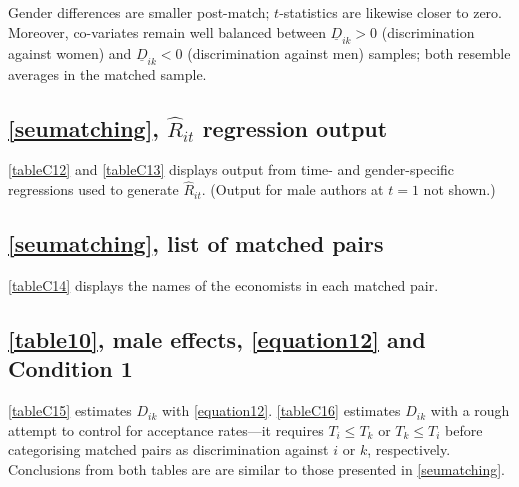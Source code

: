 \begin{appendices}
Gender differences are smaller post-match; $t$-statistics are likewise closer to zero. Moreover, co-variates remain well balanced between $\underline D_{ik}>0$ (discrimination against women) and $\underline D_{ik}<0$ (discrimination against men) samples; both resemble averages in the matched sample.

\clearpage









\clearpage

\subsection{\autoref{seumatching}, $\widehat R_{it}$ regression output}
\label{appendixreconstruction}

\autoref{tableC12} and \autoref{tableC13} displays output from time- and gender-specific regressions used to generate $\widehat R_{it}$. (Output for male authors at $t=1$ not shown.)





\subsection{\autoref{seumatching}, list of matched pairs}
\label{appendixmatchingnames}

\autoref{tableC14} displays the names of the economists in each matched pair.



\clearpage

\subsection{\autoref{table10}, male effects, \autoref{equation12} and Condition 1}
\label{appendixconservative}

\autoref{tableC15} estimates $D_{ik}$ with \autoref{equation12}. \autoref{tableC16} estimates $D_{ik}$ with a rough attempt to control for acceptance rates---it requires $T_i\le T_k$ or $T_k\le T_i$ before categorising matched pairs as discrimination against $i$ or $k$, respectively. Conclusions from both tables are are similar to those presented in \autoref{seumatching}.


\end{appendices}
